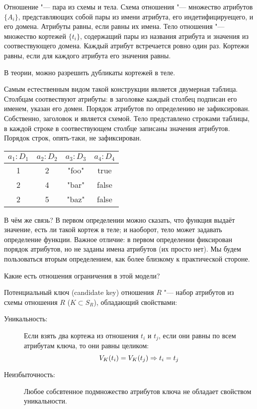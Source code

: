\begin{Def}
	Отношение "--- пара из схемы и тела.
	Схема отношения "--- множество атрибутов $\{A_i\}$, представляющих собой пары из имени атрибута, его индетифицируещего, и его домена.
	Атрибуты равны, если равны их имена.
	Тело отношения "--- множество кортежей $\{t_i\}$, содержащий пары из названия атрибута и значения из соотвествующего домена.
	Каждый атрибут встречается ровно один раз.
	Кортежи равны, если для каждого атрибута его значения равны.
\end{Def}
\begin{Rem}
	В теории, можно разрешить дубликаты кортежей в теле.
\end{Rem}
Самым естественным видом такой конструкции является двумерная таблица.
Столбцам соотвествуют атрибуты: в заголовке каждый столбец подписан его именем, указан его домен.
Порядок атрибутов по определению не зафиксирован. Собственно, заголовок и является схемой.
Тело представлено строками таблицы, в каждой строке в соотвествующем столбце записаны значения атрибутов.
Порядок строк, опять-таки, не зафиксирован.
\begin{center}\tt\begin{tabular}{|c|c|c|c|}
\hline
$a_1: D_1$ & $a_2: D_2$ & $a_3: D_3$ & $a_4: D_4$ \\
\hline
1 & 2 & "foo" & true \\
2 & 4 & "bar" & false \\
2 & 5 & "baz" & false \\
\hline
\end{tabular}\end{center}

В чём же связь?
В первом определении можно сказать, что функция выдаёт значение, есть ли такой кортеж в теле; и наоборот, тело может задавать определение функции.
Важное отличие: в первом определении фиксирован порядок атрибутов, но не заданы имена атрибутов (их просто нет).
Мы будем пользоваться вторым определением, как более близкому к практической стороне.

Какие есть отношения ограничения в этой модели?
\begin{Def}
	Потенциальный ключ (candidate key) отношения $R$ "--- набор атрибутов из схемы отношения $R$ ($K \subset S_R$), обладающий свойствами:
	\begin{description}
	\item[Уникальность:]
		Если взять два кортежа из отношения $t_i$ и $t_j$, если они равны по всем атрибутам ключа, то они равны целиком:
		\[ V_K(t_i) = V_K(t_j) \Rightarrow t_i = t_j \]
	\item[Неизбыточность:]
		Любое собсвтенное подмножество атрибутов ключа не обладает свойством уникальности.
	\end{description}
\end{Def}

